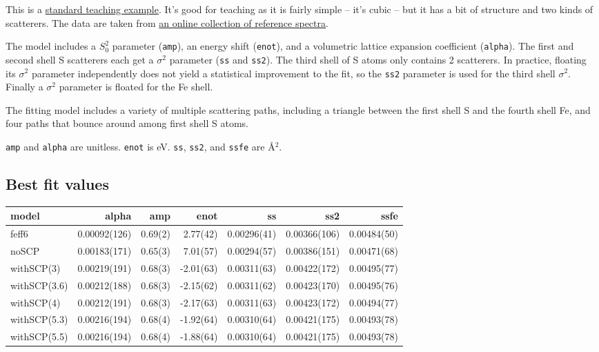 \documentclass[11pt]{article}
\begin{document}
This is a
\href{https://github.com/bruceravel/XAS-Education/tree/master/Examples/FeS2}{standard
  teaching example}. It's good for teaching as it is fairly simple --
it's cubic -- but it has a bit of structure and two kinds of
scatterers.  The data are taken from
\href{http://cars.uchicago.edu/~newville/ModelLib/search.html}{an
  online collection of reference spectra}.

The model includes a $S_0^2$ parameter (\texttt{amp}), an energy shift
(\texttt{enot}), and a volumetric lattice expansion coefficient
(\texttt{alpha}). The first and second shell S scatterers each get a
$\sigma^2$ parameter (\texttt{ss} and \texttt{ss2}). The third shell
of S atoms only contains 2 scatterers. In practice, floating its
$\sigma^2$ parameter independently does not yield a statistical
improvement to the fit, so the \texttt{ss2} parameter is used for the
third shell $\sigma^2$.  Finally a $\sigma^2$ parameter is floated for
the Fe shell.

The fitting model includes a variety of multiple scattering paths,
including a triangle between the first shell S and the fourth shell
Fe, and four paths that bounce around among first shell S atoms.

\texttt{amp} and \texttt{alpha} are unitless. \texttt{enot} is
eV. \texttt{ss}, \texttt{ss2}, and \texttt{ssfe} are {\AA}$^2$.

\subsection{Best fit values}
\label{sec:orgheadline14}

\begin{center}
  \footnotesize
  \begin{tabular}{lrrrrrr}
    model & alpha & amp & enot & ss & ss2 & ssfe\\
    \hline
    feff6        & 0.00092(126) & 0.69(2) &  2.77(42) & 0.00296(41) & 0.00366(106) & 0.00484(50)\\
    noSCP        & 0.00183(171) & 0.65(3) &  7.01(57) & 0.00294(57) & 0.00386(151) & 0.00471(68)\\
    withSCP(3)   & 0.00219(191) & 0.68(3) & -2.01(63) & 0.00311(63) & 0.00422(172) & 0.00495(77)\\
    withSCP(3.6) & 0.00212(188) & 0.68(3) & -2.15(62) & 0.00311(62) & 0.00423(170) & 0.00495(76)\\
    withSCP(4)   & 0.00212(191) & 0.68(3) & -2.17(63) & 0.00311(63) & 0.00423(172) & 0.00494(77)\\
    withSCP(5.3) & 0.00216(194) & 0.68(4) & -1.92(64) & 0.00310(64) & 0.00421(175) & 0.00493(78)\\
    withSCP(5.5) & 0.00216(194) & 0.68(4) & -1.88(64) & 0.00310(64) & 0.00421(175) & 0.00493(78)\\
  \end{tabular}
\end{center}
\end{document}
